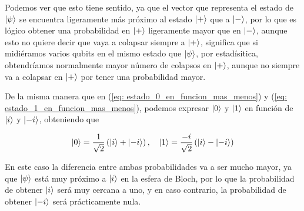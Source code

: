 \documentclass{article}
\numberwithin{equation}{section} %
\begin{document}
    \vspace{10mm}

    Podemos ver que esto tiene sentido, ya que el vector que representa el estado de \( \ket{\psi} \) se encuentra ligeramente más próximo al estado \( \ket{+} \) que a \( \ket{-} \), por lo que es lógico obtener una probabilidad en \( \ket{+} \) ligeramente mayor que en \( \ket{-} \), aunque esto no quiere decir que vaya a colapsar siempre a \( \ket{+} \), significa que si midiéramos varios qubits en el mismo estado que \( \ket{\psi} \), por estadísitica, obtendríamos normalmente mayor número de colapsos en \( \ket{+} \), aunque no siempre va a colapsar en \( \ket{+} \) por tener una probabilidad mayor.

    \vspace{5mm}

    De la misma manera que en (\ref{eq: estado_0_en_funcion_mas_menos}) y (\ref{eq: estado_1_en_funcion_mas_menos}), podemos expresar \( \ket{0} \) y \( \ket{1} \) en función de \( \ket{i} \) y \( \ket{-i} \), obteniendo que

    \begin{equation}
        \ket{0} = \frac{1}{\sqrt{2}} \left( \ket{i} + \ket{-i} \right), \quad \ket{1} = \frac{-i}{\sqrt{2}} \left( \ket{i} - \ket{-i} \right) 
        \label{eq: estado_0_y_1_en_funcion_i_menosi}
    \end{equation}

    \vspace{5mm}

    En este caso la diferencia entre ambas probabilidades va a ser mucho mayor, ya que \( \ket{\psi} \) está muy próximo a \( \ket{i} \) en la esfera de Bloch, por lo que la probabilidad de obtener \( \ket{i} \) será muy cercana a uno, y en caso contrario, la probabilidad de obtener \( \ket{-i} \) será prácticamente nula.
\end{document}
